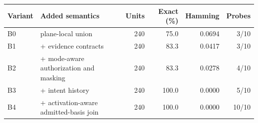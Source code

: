 \begin{tabular}{@{}llrrrr@{}}
\toprule
Variant & Added semantics & Units & Exact (\%) & Hamming & Probes \\
\midrule
B0 & plane-local union & 240 & 75.0 & 0.0694 & 3/10 \\
B1 & + evidence contracts & 240 & 83.3 & 0.0417 & 3/10 \\
B2 & + mode-aware authorization and masking & 240 & 83.3 & 0.0278 & 4/10 \\
B3 & + intent history & 240 & 100.0 & 0.0000 & 5/10 \\
B4 & + activation-aware admitted-basis join & 240 & 100.0 & 0.0000 & 10/10 \\
\bottomrule
\end{tabular}

